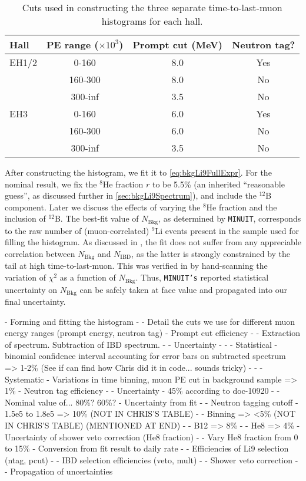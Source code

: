 \documentclass[../thesis.tex]{subfiles}
\begin{document}
\begin{table}[h]
  \centering
  \begin{tabular}{lccc}
    \toprule
    Hall & PE range ($\times10^3$) & Prompt cut (MeV) & Neutron tag? \\
    \midrule
    EH1/2  & 0-160   & 8.0 & Yes \\
           & 160-300 & 8.0 & No  \\
           & 300-inf & 3.5 & No  \\
    \midrule
    EH3  & 0-160   & 6.0 & Yes \\
         & 160-300 & 6.0 & No  \\
         & 300-inf & 3.5 & No  \\
    \bottomrule
  \end{tabular}
  \caption{Cuts used in constructing the three separate time-to-last-muon histograms for each hall.}
  \label{tab:bkgLi9Cuts}
\end{table}

After constructing the histogram, we fit it to \autoref{eq:bkgLi9FullExpr}. For the nominal result, we fix the $^8$He fraction $r$ to be 5.5\% (an inherited ``reasonable guess'', as discussed further in \autoref{sec:bkgLi9Spectrum}), and include the $^{12}$B component. Later we discuss the effects of varying the $^8$He fraction and the inclusion of $^{12}$B. The best-fit value of $N_{\mathrm{Bkg}}$, as determined by \texttt{MINUIT}, corresponds to the raw number of (muon-correlated) $^9$Li events present in the sample used for filling the histogram. As discussed in \cite{ChrisLi9}, the fit does not suffer from any appreciable correlation between $N_{\mathrm{Bkg}}$ and $N_{\mathrm{IBD}}$, as the latter is strongly constrained by the tail at high time-to-last-muon. This was verified in \cite{ChrisLi9} by hand-scanning the variation of $\chi^2$ as a function of $N_{\mathrm{Bkg}}$. Thus, \texttt{MINUIT's} reported statistical uncertainty on $N_{\mathrm{Bkg}}$ can be safely taken at face value and propagated into our final uncertainty.



- Forming and fitting the histogram
- - Detail the cuts we use for different muon energy ranges (prompt energy, neutron tag)
- Prompt cut efficiency
- - Extraction of spectrum. Subtraction of IBD spectrum.
- - Uncertainty
- - - Statistical - binomial confidence interval accounting for error bars on subtracted spectrum => 1-2\% (See if can find how Chris did it in code... sounds tricky)
- - - Systematic - Variations in time binning, muon PE cut in background sample => 1\%
- Neutron tag efficiency
- - Uncertainty - 45\% according to doc-10920
- - Nominal value of... 80\%? 60\%?
- Uncertainty from fit
- - Neutron tagging cutoff - 1.5e5 to 1.8e5 => 10\% (NOT IN CHRIS'S TABLE)
- - Binning => <5\% (NOT IN CHRIS'S TABLE) (MENTIONED AT END)
- - B12 => 8\%
- - He8 => 4\%
- Uncertainty of shower veto correction (He8 fraction)
- - Vary He8 fraction from 0 to 15\%
- Conversion from fit result to daily rate
- - Efficiencies of Li9 selection (ntag, pcut)
- - IBD selection efficiencies (veto, mult)
- - Shower veto correction
- - Propagation of uncertainties
\end{document}

